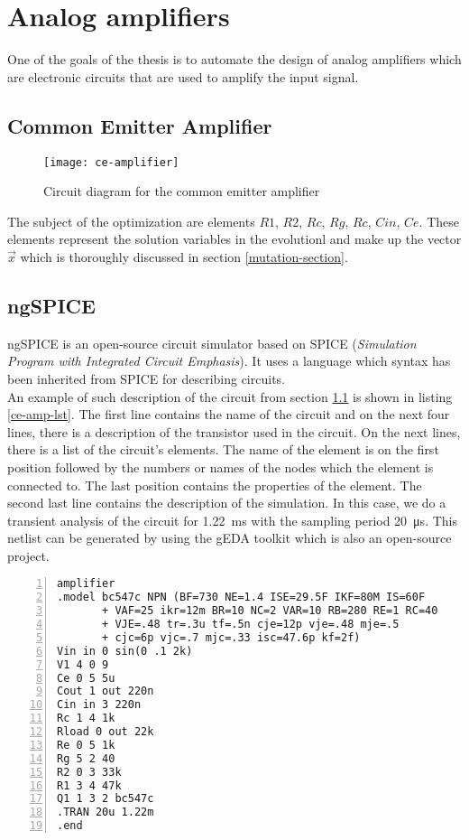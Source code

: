 \chapter{Analog amplifiers}
One of the goals of the thesis is to automate the design of analog amplifiers which are electronic circuits that are used to amplify the input signal.

\section{Common Emitter Amplifier} \label{ce-amp}

\begin{figure}[H]
    \centering
    \texttt{[image: ce-amplifier]}\label{ce-amplifier}
    \caption{Circuit diagram for the common emitter amplifier}
\end{figure}

The subject of the optimization are elements $R1$, $R2$, $Rc$, $Rg$, $Rc$, $Cin$, $Ce$. These elements represent the solution variables in the evolutionl and make up the vector $\vec{x}$ which is thoroughly discussed in section \ref{mutation-section}.

\section{ngSPICE}
ngSPICE is an open-source circuit simulator based on SPICE (\textit{Simulation Program with Integrated Circuit Emphasis}). It uses a language which syntax has been inherited from SPICE for describing circuits.\\
An example of such description of the circuit from section \ref{ce-amp} is shown in listing \ref{ce-amp-lst}. The first line contains the name of the circuit and on the next four lines, there is a description of the transistor used in the circuit. On the next lines, there is a list of the circuit's elements. The name of the element is on the first position followed by the numbers or names of the nodes which the element is connected to. The last position contains the properties of the element. The second last line contains the description of the simulation. In this case, we do a transient analysis of the circuit for \SI{1.22}{\milli\second} with the sampling period \SI{20}{\micro\second}. This netlist can be generated by using the gEDA toolkit which is also an open-source project.

\begin{lstlisting}[caption={description of an amplifier using the SPICE syntax},
                   label={ce-amp-lst},
                   captionpos=b,
                   numbers=left]
 amplifier
.model bc547c NPN (BF=730 NE=1.4 ISE=29.5F IKF=80M IS=60F
       + VAF=25 ikr=12m BR=10 NC=2 VAR=10 RB=280 RE=1 RC=40
       + VJE=.48 tr=.3u tf=.5n cje=12p vje=.48 mje=.5
       + cjc=6p vjc=.7 mjc=.33 isc=47.6p kf=2f)
Vin in 0 sin(0 .1 2k)
V1 4 0 9
Ce 0 5 5u
Cout 1 out 220n
Cin in 3 220n
Rc 1 4 1k
Rload 0 out 22k
Re 0 5 1k
Rg 5 2 40
R2 0 3 33k
R1 3 4 47k
Q1 1 3 2 bc547c
.TRAN 20u 1.22m
.end
\end{lstlisting}

